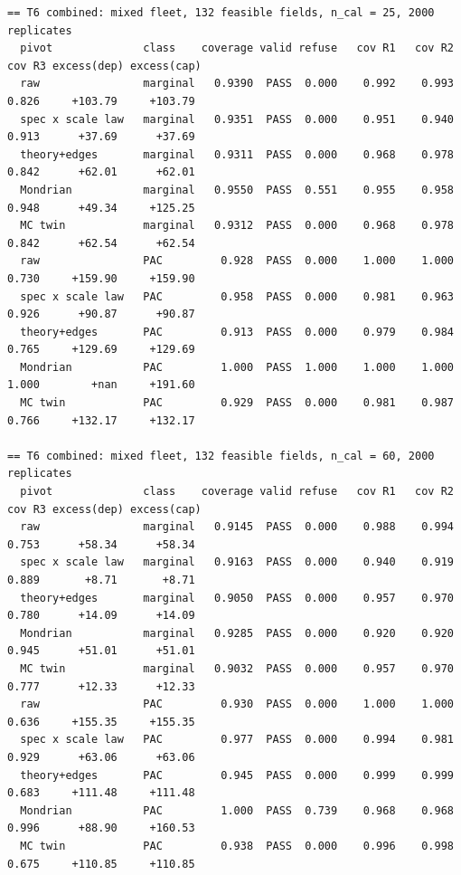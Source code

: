 \documentclass[preprint,12pt,authoryear]{elsarticle}
\begin{document}
\begin{Verbatim}[fontsize=\tiny,breaklines]
== T6 combined: mixed fleet, 132 feasible fields, n_cal = 25, 2000 replicates
  pivot              class    coverage valid refuse   cov R1   cov R2   cov R3 excess(dep) excess(cap)
  raw                marginal   0.9390  PASS  0.000    0.992    0.993    0.826     +103.79     +103.79
  spec x scale law   marginal   0.9351  PASS  0.000    0.951    0.940    0.913      +37.69      +37.69
  theory+edges       marginal   0.9311  PASS  0.000    0.968    0.978    0.842      +62.01      +62.01
  Mondrian           marginal   0.9550  PASS  0.551    0.955    0.958    0.948      +49.34     +125.25
  MC twin            marginal   0.9312  PASS  0.000    0.968    0.978    0.842      +62.54      +62.54
  raw                PAC         0.928  PASS  0.000    1.000    1.000    0.730     +159.90     +159.90
  spec x scale law   PAC         0.958  PASS  0.000    0.981    0.963    0.926      +90.87      +90.87
  theory+edges       PAC         0.913  PASS  0.000    0.979    0.984    0.765     +129.69     +129.69
  Mondrian           PAC         1.000  PASS  1.000    1.000    1.000    1.000        +nan     +191.60
  MC twin            PAC         0.929  PASS  0.000    0.981    0.987    0.766     +132.17     +132.17

== T6 combined: mixed fleet, 132 feasible fields, n_cal = 60, 2000 replicates
  pivot              class    coverage valid refuse   cov R1   cov R2   cov R3 excess(dep) excess(cap)
  raw                marginal   0.9145  PASS  0.000    0.988    0.994    0.753      +58.34      +58.34
  spec x scale law   marginal   0.9163  PASS  0.000    0.940    0.919    0.889       +8.71       +8.71
  theory+edges       marginal   0.9050  PASS  0.000    0.957    0.970    0.780      +14.09      +14.09
  Mondrian           marginal   0.9285  PASS  0.000    0.920    0.920    0.945      +51.01      +51.01
  MC twin            marginal   0.9032  PASS  0.000    0.957    0.970    0.777      +12.33      +12.33
  raw                PAC         0.930  PASS  0.000    1.000    1.000    0.636     +155.35     +155.35
  spec x scale law   PAC         0.977  PASS  0.000    0.994    0.981    0.929      +63.06      +63.06
  theory+edges       PAC         0.945  PASS  0.000    0.999    0.999    0.683     +111.48     +111.48
  Mondrian           PAC         1.000  PASS  0.739    0.968    0.968    0.996      +88.90     +160.53
  MC twin            PAC         0.938  PASS  0.000    0.996    0.998    0.675     +110.85     +110.85


\end{Verbatim}
\end{document}
